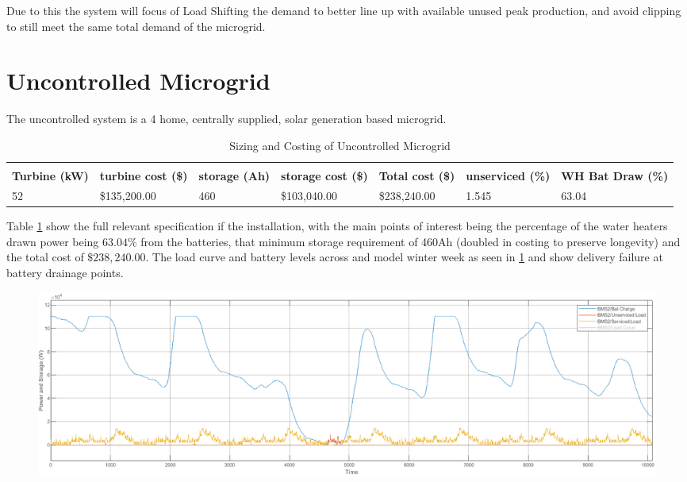\documentclass[11pt]{article}
\begin{document}
    Due to this the system will focus of Load Shifting the demand to better line up with available unused peak production, and avoid clipping to still meet the same total demand of the microgrid.

\newpage
\section{Uncontrolled Microgrid}
    The uncontrolled system is a 4 home, centrally supplied, solar generation based microgrid. 
    \begin{table}[h!]
        \begin{adjustbox}{width=\textwidth}
            \begin{tabular}{lllllll}
                \multicolumn{7}{c}{\cellcolor[HTML]{FFC7CE}{\color[HTML]{9C0006} Uncontrolled}}                                                                                                            \\
                \textbf{Turbine (kW)} & \textbf{turbine cost (\$)} & \textbf{storage (Ah)} & \textbf{storage cost (\$)} & \textbf{Total cost (\$)} & \textbf{unserviced (\%)} & \textbf{WH Bat Draw (\%)} \\
                52                    & \$135,200.00               & 460                    & \$103,040.00               & \$238,240.00             & 1.545                    & 63.04                    
            \end{tabular}
        \end{adjustbox}
        \caption{Sizing and Costing of Uncontrolled Microgrid}
        \label{tab:unc}
    \end{table}

    Table \ref{tab:unc} show the full relevant specification if the installation, with the main points of interest being the percentage of the water heaters drawn power being $63.04\%$ from the batteries, that minimum storage requirement of 460Ah (doubled in costing to preserve longevity) and the total cost of $\$238,240.00$. The load curve and battery levels across and model winter week as seen in \ref{fig:uncontrolled_load} and show delivery failure at battery drainage points.

    
    \begin{figure}[h!]
        \centering
        \includegraphics[width=\textwidth]{inc/uncontrolled_charge.png}
        \caption{}
        \label{fig:uncontrolled_load}
    \end{figure}
    
\end{document}
